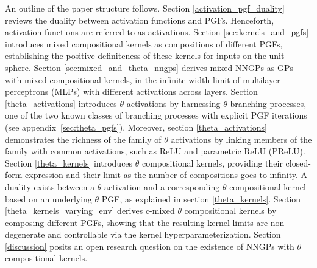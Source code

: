 \documentclass[final, 12pt]{colt2021} %
\begin{document}
An outline of the paper structure follows.
Section \ref{activation_pgf_duality} reviews
the duality between activation functions and PGFs.
Henceforth, activation functions are referred to as
activations.
Section \ref{sec:kernels_and_pgfs}
introduces mixed compositional kernels
as compositions of different PGFs,
establishing the positive definiteness of these kernels
for inputs on the unit sphere.
Section \ref{sec:mixed_and_theta_nngps} derives mixed NNGPs
as GPs with mixed compositional kernels,
in the infinite-width limit of multilayer perceptrons (MLPs)
with different activations across layers.
Section \ref{theta_activations}
introduces $\theta$ activations
by harnessing $\theta$ branching processes,
one of the two known classes of branching processes
with explicit PGF iterations (see appendix~\ref{sec:theta_pgfs}).
Moreover, section \ref{theta_activations}
demonstrates the richness of the family of $\theta$ activations
by linking members of the family with common activations,
such as ReLU and parametric ReLU (PReLU).
Section \ref{theta_kernels}
introduces $\theta$ compositional kernels,
providing their closed-form expression
and their limit as the number of compositions goes to infinity.
A duality exists between
a $\theta$ activation and a corresponding $\theta$ compositional kernel
based on an underlying $\theta$ PGF,
as explained in section \ref{theta_kernels}.
Section \ref{theta_kernels_varying_env}
derives c-mixed $\theta$ compositional kernels by composing different PGFs,
showing that the resulting kernel limits are non-degenerate
and controllable via the kernel hyperparameterization.
Section \ref{discussion}
posits an open research question
on the existence of NNGPs with $\theta$ compositional kernels.




\end{document}
